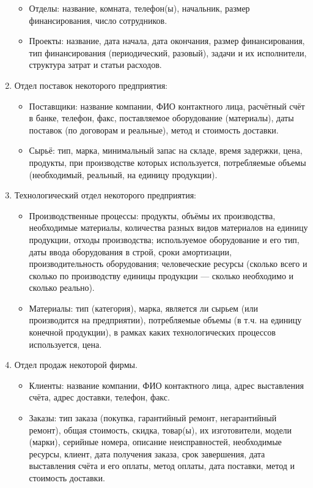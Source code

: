 \documentclass[12pt, openany, twoside]{book} %
\begin{document}
\begin{enumerate}
\begin{itemize}
\item Отделы: название, комната, телефон(ы), начальник, размер финансирования, число сотрудников.
\item Проекты: название, дата начала, дата окончания, размер финансирования, тип финансирования (периодический, разовый), задачи и их исполнители, структура затрат и статьи расходов.
\end{itemize}
\item Отдел поставок некоторого предприятия:
\begin{itemize}
\item Поставщики: название компании, ФИО контактного лица, расчётный счёт в банке, телефон, факс, поставляемое оборудование (материалы), даты поставок (по договорам и реальные), метод и стоимость доставки.
\item Сырьё: тип, марка, минимальный запас на складе, время задержки, цена, продукты, при производстве которых используется, потребляемые объемы (необходимый, реальный, на единицу продукции).
\end{itemize}
\item Технологический отдел некоторого предприятия:
\begin{itemize}
\item Производственные процессы: продукты, объёмы их производства, необходимые материалы, количества разных видов материалов на единицу продукции, отходы производства; используемое оборудование и его тип, даты ввода оборудования в строй, сроки амортизации, производительность оборудования; человеческие ресурсы (сколько всего и сколько по производству единицы продукции --- сколько необходимо и сколько реально).
\item Материалы: тип (категория), марка, является ли сырьем (или производится на предприятии), потребляемые объемы (в т.ч. на единицу конечной продукции), в рамках каких технологических процессов используется, цена.
\end{itemize}
\item Отдел продаж некоторой фирмы.
\begin{itemize}
\item Клиенты: название компании, ФИО контактного лица, адрес выставления счёта, адрес доставки, телефон, факс.
\item Заказы: тип заказа (покупка, гарантийный ремонт, негарантийный ремонт), общая стоимость, скидка, товар(ы), их изготовители, модели (марки), серийные номера, описание неисправностей, необходимые ресурсы, клиент, дата получения заказа, срок завершения, дата выставления счёта и его оплаты, метод оплаты, дата поставки, метод и стоимость доставки.

\end{itemize}
\end{enumerate}
\end{document}
